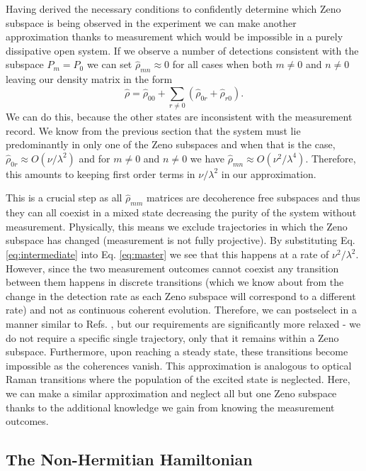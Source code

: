Having derived the necessary conditions to confidently determine which
Zeno subspace is being observed in the experiment we can make another
approximation thanks to measurement which would be impossible in a
purely dissipative open system. If we observe a number of detections
consistent with the subspace $P_m = P_0$ we can set
$\hat{\rho}_{mn} \approx 0$ for all cases when both $m \ne 0$ and
$n \ne 0$ leaving our density matrix in the form
\begin{equation}
  \label{eq:approxrho}
  \hat{\rho} = \hat{\rho}_{00} + \sum_{r\ne0} (\hat{\rho}_{0r} +
  \hat{\rho}_{r0}).
\end{equation}
We can do this, because the other states are inconsistent with the
measurement record. We know from the previous section that the system
must lie predominantly in only one of the Zeno subspaces and when that
is the case, $\hat{\rho}_{0r} \approx O(\nu/\lambda^2)$ and for
$m \ne 0$ and $n \ne 0$ we have
$\hat{\rho}_{mn} \approx O(\nu^2/\lambda^4)$. Therefore, this amounts
to keeping first order terms in $\nu/\lambda^2$ in our approximation.

This is a crucial step as all $\hat{\rho}_{mm}$ matrices are
decoherence free subspaces and thus they can all coexist in a mixed
state decreasing the purity of the system without
measurement. Physically, this means we exclude trajectories in which
the Zeno subspace has changed (measurement is not fully projective). By
substituting Eq. \eqref{eq:intermediate} into Eq. \eqref{eq:master} we
see that this happens at a rate of $\nu^2 / \lambda^2$. However, since
the two measurement outcomes cannot coexist any transition between
them happens in discrete transitions (which we know about from the
change in the detection rate as each Zeno subspace will correspond to
a different rate) and not as continuous coherent evolution. Therefore,
we can postselect in a manner similar to Refs. \cite{otterbach2014,
  lee2014prx, lee2014prl}, but our requirements are significantly more
relaxed - we do not require a specific single trajectory, only that it
remains within a Zeno subspace. Furthermore, upon reaching a steady
state, these transitions become impossible as the coherences
vanish. This approximation is analogous to optical Raman transitions
where the population of the excited state is neglected. Here, we can
make a similar approximation and neglect all but one Zeno subspace
thanks to the additional knowledge we gain from knowing the
measurement outcomes.

\subsection{The Non-Hermitian Hamiltonian}


